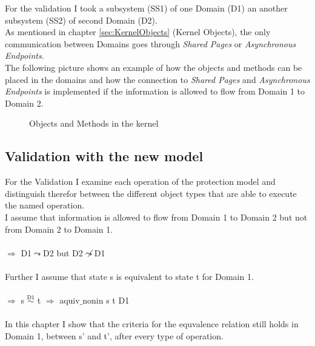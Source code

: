 \documentclass[pdftex,11pt,a4paper]{article}
\begin{document}
For the validation I took a subsystem (SS1) of one Domain (D1) an another subsystem (SS2) of second Domain (D2). \\
As mentioned in chapter \ref{sec:KernelObjects} (Kernel Objects), the only communication between Domains goes through \textit{Shared Pages} or \textit{Asynchronous Endpoints}. \\
The following picture shows an example of how the objects and methods can be placed in the domains and how the connection to \textit{Shared Pages} and \textit{Asynchronous Endpoints} is implemented if the information is allowed to flow from Domain 1 to Domain 2.
\begin{figure}[H]
\caption{Objects and Methods in the kernel}
\end{figure}
\subsection{Validation with the new model}\label{sec:ValNew}
For the Validation I examine each operation of the protection model and distinguish therefor between the different object types that are able to execute the named operation. \\
I assume that information is allowed to flow from Domain 1 to Domain 2 but not from Domain 2 to Domain 1. \\ \\
$\Rightarrow$ D1$\leadsto$D2 but D2$\not\leadsto$D1 \\ \\
Further I assume that state s is equivalent to state t for Domain 1. \\ \\
$\Rightarrow$ s $\overset{\text{D1}}{\sim}$ t $\Rightarrow$ aquiv$\_$nonin s t D1	\\ \\
In this chapter I show that the criteria for the equvalence relation still holds in Domain 1, between s' and t', after every type of operation. 
\end{document}
